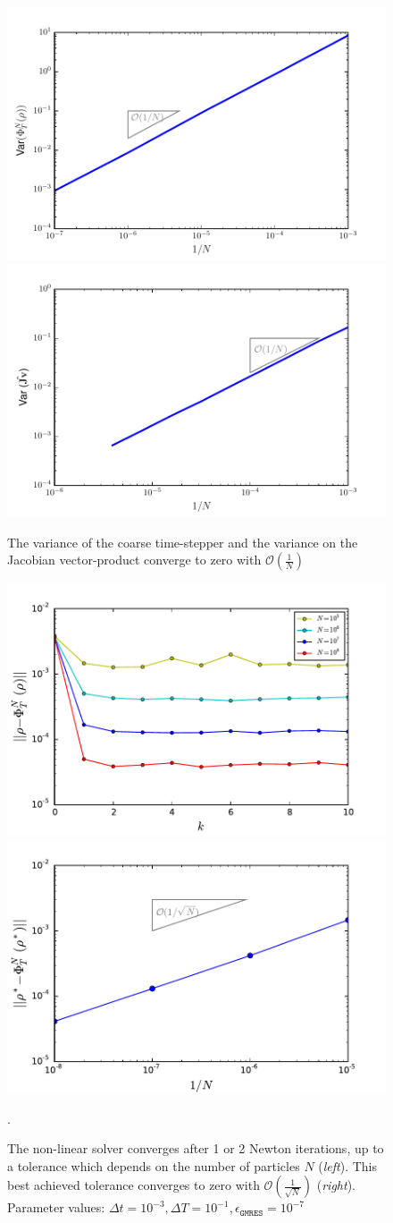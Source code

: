 \begin{figure}[H!]
\centering
\includegraphics[width=0.49\linewidth]{../Problems/WeightedParticles/checkSystem/plots/Variance_on_cts(N-1)}
\includegraphics[width=0.49\linewidth]{../Problems/WeightedParticles/checkSystem/plots/Variance_on_Jv}
\caption{The variance of the coarse time-stepper and the variance on the Jacobian vector-product converge to zero with $\mathcal{O}(\frac{1}{N})$ }
\label{fig:Variance_on_cts(N-1)}
\end{figure}



\begin{figure}[H!]
\centering
\includegraphics[width=0.5\linewidth]{../Problems/WeightedParticles/checkSystem/Newton/plots/Newton_sde_res(k)_Dt_e-2_tol1e-7.pdf}
\includegraphics[width=0.49\linewidth]{../Problems/WeightedParticles/checkSystem/Newton/plots/Tolerance_on_NK-solution_converges_N-1_tol_1e-7.pdf}

\caption{ The non-linear solver converges after 1 or 2 Newton iterations, up to a tolerance which depends on the number of particles $N$ (\textit{left}). This best achieved tolerance converges to zero with  $\mathcal{O}(\frac{1}{\sqrt{N}})$ (\textit{right}). Parameter values:  $\Delta t = 10^{-3}, \Delta T = 10^{-1} , \epsilon_{\texttt{GMRES}}=10^{-7}$
}.
\label{fig:Newton_sde_res(k)}
\end{figure}



